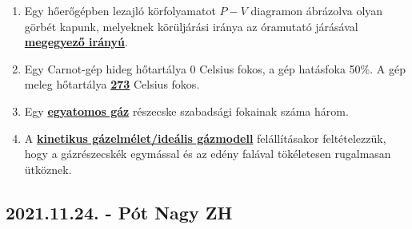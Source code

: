 \documentclass[../../fizika_kerdesek.tex]{subfiles}
\begin{document}
{\begin{enumerate}
                \item Egy hőerőgépben lezajló körfolyamatot $P-V$ diagramon ábrázolva olyan görbét kapunk, melyeknek körüljárási iránya az óramutató járásával \underline{\textbf{megegyező irányú}}.
                \item Egy Carnot-gép hideg hőtartálya $0$ Celsius fokos, a gép hatásfoka 50\%. A gép meleg hőtartálya \underline{\textbf{273}} Celsius fokos.
                \item Egy \underline{\textbf{egyatomos gáz}} részecske szabadsági fokainak száma három.
                \item A \underline{\textbf{kinetikus gázelmélet/ideális gázmodell}} felállításakor feltételezzük, hogy a gázrészecskék egymással és az edény falával tökéletesen rugalmasan ütköznek.
            \end{enumerate}}

    \subsection{2021.11.24. - Pót Nagy ZH}
\end{document}
